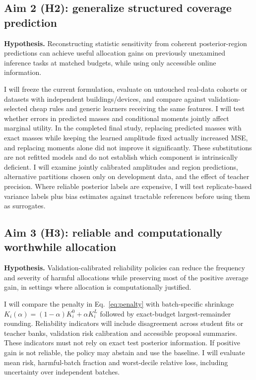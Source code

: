 \documentclass[10pt,letterpaper]{article}
\begin{document}
\subsection{Aim 2 (H2): generalize structured coverage prediction}
\textbf{Hypothesis.} Reconstructing statistic sensitivity from coherent posterior-region predictions can achieve useful allocation gains on previously unexamined inference tasks at matched budgets, while using only accessible online information.

I will freeze the current formulation, evaluate on untouched real-data cohorts or datasets with independent buildings/devices, and compare against validation-selected cheap rules and generic learners receiving the same features. I will test whether errors in predicted masses and conditional moments jointly affect marginal utility. In the completed final study, replacing predicted masses with exact masses while keeping the learned amplitude fixed actually increased MSE, and replacing moments alone did not improve it significantly. These substitutions are not refitted models and do not establish which component is intrinsically deficient. I will examine jointly calibrated amplitudes and region predictions, alternative partitions chosen only on development data, and the effect of teacher precision. Where reliable posterior labels are expensive, I will test replicate-based variance labels plus bias estimates against tractable references before using them as surrogates.
\subsection{Aim 3 (H3): reliable and computationally worthwhile allocation}
\textbf{Hypothesis.} Validation-calibrated reliability policies can reduce the frequency and severity of harmful allocations while preserving most of the positive average gain, in settings where allocation is computationally justified.

I will compare the penalty in Eq.~\eqref{eq:penalty} with batch-specific shrinkage $K_i(\alpha)=(1-\alpha)K_i^0+\alpha K_i^L$ followed by exact-budget largest-remainder rounding. Reliability indicators will include disagreement across student fits or teacher banks, validation risk calibration and accessible proposal summaries. These indicators must not rely on exact test posterior information. If positive gain is not reliable, the policy may abstain and use the baseline. I will evaluate mean risk, harmful-batch fraction and worst-decile relative loss, including uncertainty over independent batches.
\end{document}
